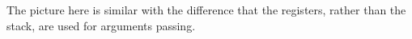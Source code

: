 
The picture here is similar with the difference that the registers, rather than the stack, are used for arguments passing.







